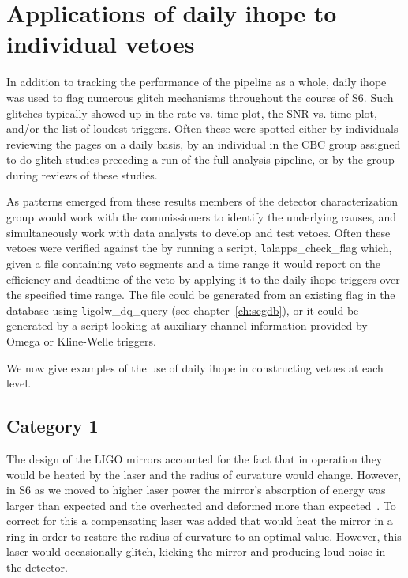 \section{Applications of daily ihope to individual vetoes}

In addition to tracking the performance of the pipeline as a whole,
daily ihope was used to flag numerous glitch mechanisms throughout the
course of S6.  Such glitches typically showed up in the rate vs. time
plot, the SNR vs. time plot, and/or the list of loudest triggers.
Often these were spotted either by individuals reviewing the pages on
a daily basis, by an individual in the CBC group assigned  to do
glitch studies preceding a run of the full analysis pipeline, or by
the group during reviews of these studies.

As patterns emerged from these results members of the detector
characterization group would work with the commissioners to identify
the underlying causes, and simultaneously work with data analysts to
develop and test vetoes.  Often these vetoes were verified against the
by running a script, {\texttt lalapps\_check\_flag} which, given a
file containing veto segments and a time range it would report on the
efficiency and deadtime of the veto by applying it to the daily ihope
triggers over the specified time range.  The file could be generated
from an existing flag in the database using {\texttt
ligolw\_dq\_query} (see chapter~\ref{ch:segdb}), or it could be generated
by a script looking at auxiliary channel information provided by 
Omega or Kline-Welle triggers.

We now give examples of the use of daily ihope in constructing vetoes
at each level.

\subsection{Category 1}


The design of the LIGO mirrors accounted for the fact that in
operation they would be heated by the laser and the radius of
curvature would change.  However, in S6 as we moved to higher laser
power the mirror's absorption of energy was larger than expected and
the overheated and deformed more than expected~\cite{}.  To correct
for this a compensating laser was added that would heat the mirror in
a ring in order to restore the radius of curvature to an optimal
value.  However, this laser would occasionally glitch, kicking the
mirror and producing loud noise in the detector.

